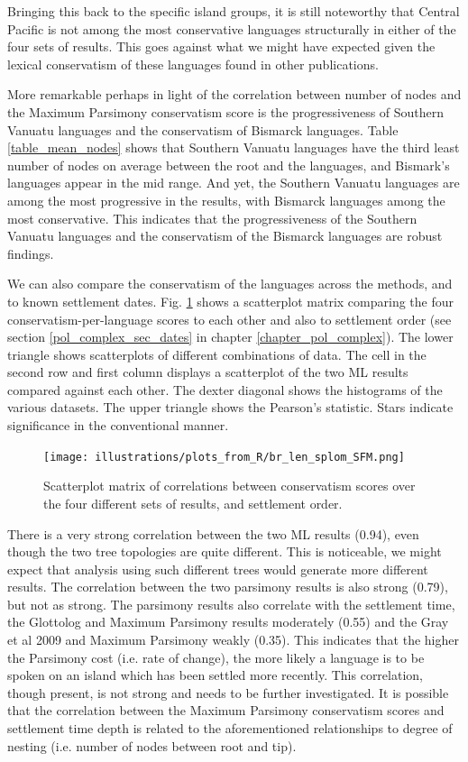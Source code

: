 \documentclass[draft,10pt]{article} %
\begin{document}
Bringing this back to the specific island groups, it is still noteworthy that Central Pacific is not among the most conservative languages structurally in either of the four sets of results. This goes against what we might have expected given the lexical conservatism of these languages found in other publications. 

More remarkable perhaps in light of the correlation between number of nodes and the Maximum Parsimony conservatism score is the progressiveness of Southern Vanuatu languages and the conservatism of Bismarck languages. Table \ref{table_mean_nodes} shows that Southern Vanuatu languages have the third least number of nodes on average between the root and the languages, and Bismark's languages appear in the mid range. And yet, the Southern Vanuatu languages are among the most progressive in the results, with Bismarck languages among the most conservative. This indicates that the progressiveness of the Southern Vanuatu languages and the conservatism of the Bismarck languages are robust findings.

We can also compare the conservatism of the languages across the methods, and to known settlement dates. Fig. \ref{SPLOM_BR_len} shows a scatterplot matrix comparing the four conservatism-per-language scores to each other and also to settlement order (see section \ref{pol_complex_sec_dates} in chapter \ref{chapter_pol_complex}). The lower triangle shows scatterplots of different combinations of data. The cell in the second row and first column displays a scatterplot of the two ML results compared against each other. The dexter diagonal shows the histograms of the various datasets. The upper triangle shows the Pearson's statistic. Stars indicate significance in the conventional manner. 

\begin{figure}[H]
\centering
\texttt{[image: illustrations/plots\_from\_R/br\_len\_splom\_SFM.png]}
\caption{{Scatterplot matrix of correlations between conservatism scores over the four different sets of results, and settlement order.}}
\label{SPLOM_BR_len}
\end{figure}

There is a very strong correlation between the two ML results (0.94), even though the two tree topologies are quite different. This is noticeable, we might expect that analysis using such different trees would generate more different results. The correlation between the two parsimony results is also strong (0.79), but not as strong. The parsimony results also correlate with the settlement time, the Glottolog and Maximum Parsimony results moderately (0.55) and the Gray et al 2009 and Maximum Parsimony weakly (0.35). This indicates that the higher the Parsimony cost (i.e. rate of change), the more likely a language is to be spoken on an island which has been settled more recently. This correlation, though present, is not strong and needs to be further investigated. It is possible that the correlation between the Maximum Parsimony conservatism scores and settlement time depth is related to the aforementioned relationships to degree of nesting (i.e. number of nodes between root and tip).
\end{document}
